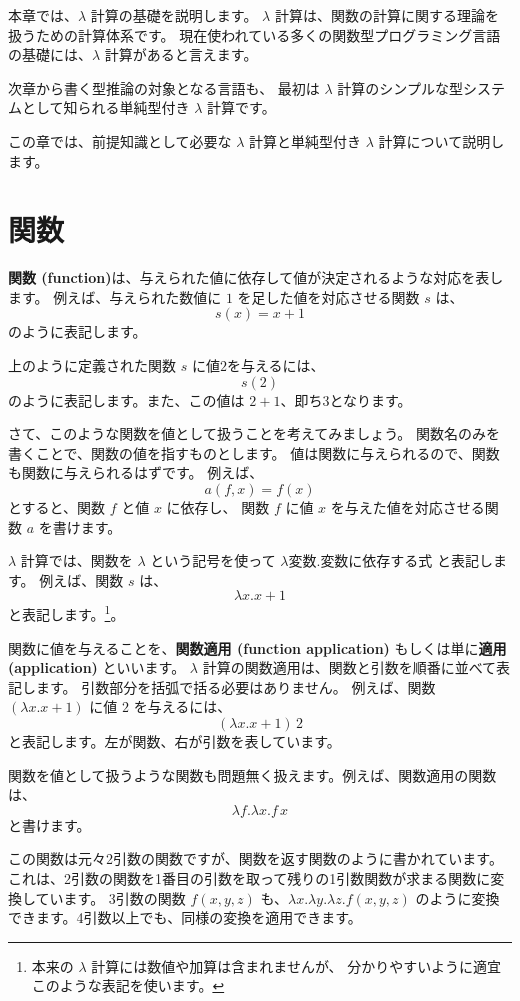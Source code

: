 
本章では、$\lambda$ 計算の基礎を説明します。
$\lambda$ 計算は、関数の計算に関する理論を扱うための計算体系です。
現在使われている多くの関数型プログラミング言語の基礎には、$\lambda$ 計算があると言えます。

次章から書く型推論の対象となる言語も、
最初は $\lambda$ 計算のシンプルな型システムとして知られる単純型付き $\lambda$ 計算です。

この章では、前提知識として必要な $\lambda$ 計算と単純型付き $\lambda$ 計算について説明します。

\section{関数}

\textbf{関数 (function)}は、与えられた値に依存して値が決定されるような対応を表します。
例えば、与えられた数値に $1$ を足した値を対応させる関数 $s$ は、
\[
  s(x) = x+1
\]
のように表記します。

上のように定義された関数 $s$ に値$2$を与えるには、
\[
  s(2)
\]
のように表記します。また、この値は $2+1$、即ち$3$となります。

さて、このような関数を値として扱うことを考えてみましょう。
関数名のみを書くことで、関数の値を指すものとします。
値は関数に与えられるので、関数も関数に与えられるはずです。
例えば、
\[
  a(f, x) = f(x)
\]
とすると、関数 $f$ と値 $x$ に依存し、
関数 $f$ に値 $x$ を与えた値を対応させる関数 $a$ を書けます。

$\lambda$ 計算では、関数を $\lambda$ という記号を使って
$\lambda \text{変数} . \text{変数に依存する式}$ と表記します。
例えば、関数 $s$ は、
\[
  \lambda x . x + 1
\]
と表記します。\footnote{本来の $\lambda$ 計算には数値や加算は含まれませんが、
分かりやすいように適宜このような表記を使います。}。

関数に値を与えることを、\textbf{関数適用 (function application)}
もしくは単に\textbf{適用 (application)} といいます。
$\lambda$ 計算の関数適用は、関数と引数を順番に並べて表記します。
引数部分を括弧で括る必要はありません。
例えば、関数 $(\lambda x . x + 1)$ に値 $2$ を与えるには、
\[
  (\lambda x . x + 1) \, 2
\]
と表記します。左が関数、右が引数を表しています。

関数を値として扱うような関数も問題無く扱えます。例えば、関数適用の関数は、
\[
  \lambda f . \lambda x . f \, x
\]
と書けます。

この関数は元々2引数の関数ですが、関数を返す関数のように書かれています。
これは、2引数の関数を1番目の引数を取って残りの1引数関数が求まる関数に変換しています。
3引数の関数 $f(x, y, z)$ も、$\lambda x . \lambda y . \lambda z . f(x, y, z)$
のように変換できます。4引数以上でも、同様の変換を適用できます。

